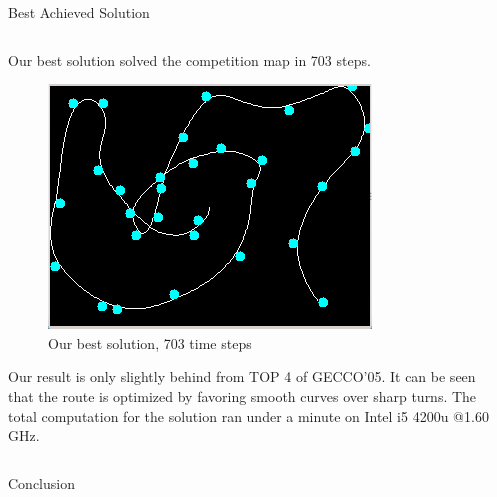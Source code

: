 \documentclass[final,t]{beamer}
\begin{document}
\begin{frame}{}
\begin{columns}[t]
\begin{column}{.305\linewidth}

    \end{column}

    
    \begin{column}{.305\linewidth}

      \begin{block}{Best Achieved Solution}
        \centering
        \begin{column}{.97\linewidth}
        \justifying
        Our best solution solved the competition map in 703 steps.

        \begin{figure}
          \centering
          \includegraphics[width=0.9\linewidth]{our_best.png}          
          \caption{\centering Our best solution, 703 time steps}
        \end{figure}

        Our result is only slightly behind from TOP 4 of GECCO'05. It can be seen that the route is optimized by \alert{favoring smooth curves} over sharp turns. The total computation for the solution ran under a minute on Intel i5 4200u @1.60 GHz.
        \end{column}
      \end{block}
      
  
        
                
      \begin{block}{Conclusion}
      

\end{block}
\end{column}
\end{columns}
\end{frame}
\end{document}
